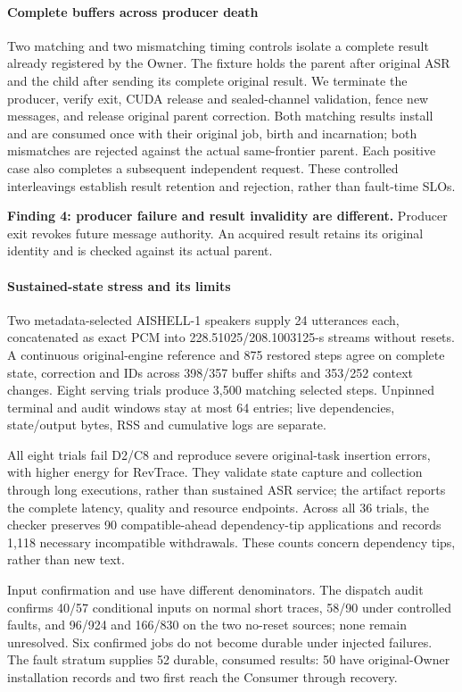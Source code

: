\paragraph{Complete buffers across producer death}
Two matching and two mismatching timing controls isolate a complete result
already registered by the Owner. The fixture holds the parent after
original ASR and the child after sending its complete original result.
We terminate the producer, verify exit, CUDA release and sealed-channel
validation, fence new messages, and release original parent correction.
Both matching results install and are consumed once with their original
job, birth and incarnation; both mismatches are rejected against the
actual same-frontier parent. Each positive case also completes a subsequent
independent request. These controlled interleavings establish result
retention and rejection, rather than fault-time SLOs.
\par\noindent\textbf{Finding 4: producer failure and result invalidity are different.}
Producer exit revokes future message authority. An acquired result retains
its original identity and is checked against its actual parent.

\paragraph{Sustained-state stress and its limits}
Two metadata-selected AISHELL-1 speakers supply 24 utterances each,
concatenated as exact PCM into 228.51025/208.1003125-s streams without
resets. A continuous original-engine reference and 875 restored steps
agree on complete state, correction and IDs across 398/357 buffer shifts
and 353/252 context changes. Eight serving trials produce 3,500 matching
selected steps. Unpinned terminal and audit windows stay at most 64
entries; live dependencies, state/output bytes, RSS and cumulative logs
are separate.

All eight trials fail D2/C8 and reproduce severe original-task insertion
errors, with higher energy for RevTrace. They validate state capture and
collection through long executions, rather than sustained ASR service;
the artifact reports the complete latency, quality and resource endpoints.
Across all 36 trials, the checker preserves 90 compatible-ahead
dependency-tip applications and records 1,118 necessary incompatible
withdrawals. These counts concern dependency tips, rather than new text.

Input confirmation and use have different denominators. The dispatch
audit confirms 40/57 conditional inputs on normal short traces, 58/90
under controlled faults, and 96/924 and 166/830 on the two no-reset sources;
none remain unresolved. Six confirmed jobs do not become durable under
injected failures. The fault stratum supplies 52 durable, consumed results:
50 have original-Owner installation records and two first reach the
Consumer through recovery.

